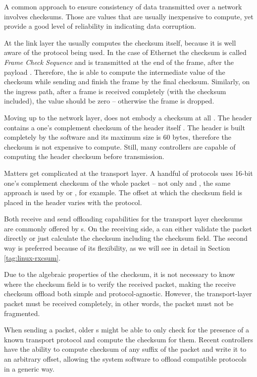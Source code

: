 A common approach to ensure consistency of data transmitted over a network
involves checksums. Those are values that are usually inexpensive to compute,
yet provide a good level of reliability in indicating data corruption.

At the link layer the  usually computes the checksum itself, because it
is well aware of the protocol being used. In the case of Ethernet the
checksum is called \emph{Frame Check Sequence} and is transmitted at the end of
the frame, after the payload \cite{ethernet}. Therefore, the  is able to
compute the intermediate value of the checksum while sending and finish the frame
by the final checksum. Similarly, on the ingress path, after a frame is received
completely (with the checksum included), the value should be zero -- otherwise
the frame is dropped.

Moving up to the network layer,  does not embody a checksum at
all \cite{RFC2460}. The  header contains a one's complement checksum of the
header itself \cite{RFC0791}. The header is built completely by the software
and its maximum size is 60 bytes,
therefore the checksum is not expensive to compute. Still, many controllers are
capable of computing the  header checksum before transmission.

Matters get complicated at the transport layer. A handful of protocols uses 16-bit
one's complement checksum of the whole packet -- not only  and ,
the same approach is used by  or , for example. The offset at
which the checksum field is placed in the header varies with the protocol.

Both receive and send offloading capabilities for the transport layer checksums are
commonly offered by s. On the receiving side, a  can either
validate the packet directly or just calculate the checksum including the
checksum field. The second way is preferred because of its flexibility, as we
will see in detail in Section \ref{tag:linux-rxcsum}.

Due to the algebraic properties of the checksum, it is not necessary to know
where the checksum field is to verify the received packet, making the receive
checksum offload both simple and protocol-agnostic. However, the
transport-layer packet must be received completely, in other words, the 
packet must not be fragmented.

When sending a packet, older s might be able to only check for
the presence of a known transport protocol and compute the checksum for them.
Recent controllers have the ability to compute checksum of any suffix of the
packet and write it to an arbitrary offset, allowing the system software to
offload compatible protocols in a generic way.

